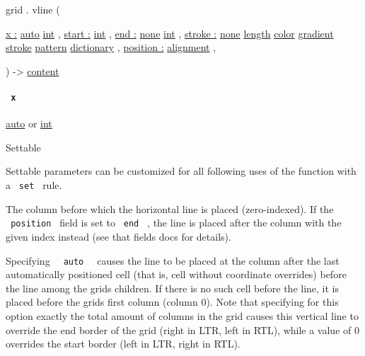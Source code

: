 grid { . } { vline } (

{ \hyperref[definitions-vline-parameters-x]{x :}
\href{/docs/reference/foundations/auto/}{auto}
\href{/docs/reference/foundations/int/}{int} , } {
\hyperref[definitions-vline-parameters-start]{start :}
\href{/docs/reference/foundations/int/}{int} , } {
\hyperref[definitions-vline-parameters-end]{end :}
\href{/docs/reference/foundations/none/}{none}
\href{/docs/reference/foundations/int/}{int} , } {
\hyperref[definitions-vline-parameters-stroke]{stroke :}
\href{/docs/reference/foundations/none/}{none}
\href{/docs/reference/layout/length/}{length}
\href{/docs/reference/visualize/color/}{color}
\href{/docs/reference/visualize/gradient/}{gradient}
\href{/docs/reference/visualize/stroke/}{stroke}
\href{/docs/reference/visualize/pattern/}{pattern}
\href{/docs/reference/foundations/dictionary/}{dictionary} , } {
\hyperref[definitions-vline-parameters-position]{position :}
\href{/docs/reference/layout/alignment/}{alignment} , }

) -\textgreater{} \href{/docs/reference/foundations/content/}{content}

\paragraph{\texorpdfstring{\texttt{\ x\ }}{ x }}\label{definitions-vline-x}

\href{/docs/reference/foundations/auto/}{auto} {or}
\href{/docs/reference/foundations/int/}{int}

{{ Settable }}

\label{definitions-vline-x-settable-tooltip}
Settable parameters can be customized for all following uses of the
function with a \texttt{\ set\ } rule.

The column before which the horizontal line is placed (zero-indexed). If
the \texttt{\ position\ } field is set to \texttt{\ end\ } , the line is
placed after the column with the given index instead (see that
field\textquotesingle s docs for details).

Specifying \texttt{\ }{\texttt{\ auto\ }}\texttt{\ } causes the line to
be placed at the column after the last automatically positioned cell
(that is, cell without coordinate overrides) before the line among the
grid\textquotesingle s children. If there is no such cell before the
line, it is placed before the grid\textquotesingle s first column
(column 0). Note that specifying for this option exactly the total
amount of columns in the grid causes this vertical line to override the
end border of the grid (right in LTR, left in RTL), while a value of 0
overrides the start border (left in LTR, right in RTL).

